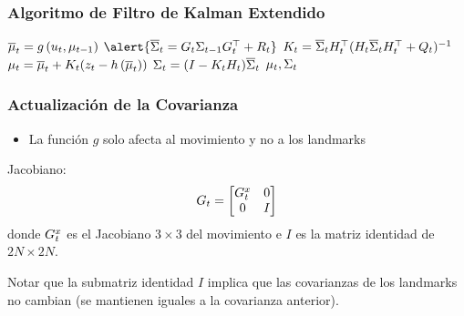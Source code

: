\begin{frame}
    \frametitle{Algoritmo de Filtro de Kalman Extendido}
    
    \begin{algorithmic}[1]
        \State $\overline{\mu}_{t} = g\left( u_{t}, \mu_{t-1} \right)$
        \State $\alert{\overline{\covariance}_{t} = \motionModelJacobian_{t} \covariance_{t-1} \motionModelJacobian_{t}^{\top}+\motionParametersCovariance_{t}}$
        \Statex
        \State $K_{t} = \overline{\Sigma}_{t} H_{t}^{\top} (H_{t} \overline{\Sigma}_{t}  H_{t}^{\top} + Q_{t})^{-1} $
        \State $\mu_{t} = \overline{\mu}_{t} + K_{t} (z_{t} - h\left( \overline{\mu}_{t} \right))$
        \State $\Sigma_{t} =  (I - K_{t} H_{t}) \overline{\Sigma}_{t}$
        \State \Return $\mu_{t}, \Sigma_{t}$
    \EndProcedure
    \end{algorithmic}
\end{frame}

\begin{frame}
    \frametitle{Actualización de la Covarianza}

    \begin{itemize}
        \item La función $g$ solo afecta al movimiento y no a los landmarks
    \end{itemize}

    Jacobiano:
    \begin{equation*}
        G_t = 
        \begin{bmatrix}
            G_{t}^{x} & 0 \\
            0 & I
        \end{bmatrix}
    \end{equation*}
    donde $G_{t}^{x}$ es el Jacobiano $3 \times 3$ del movimiento e $I$ es la matriz identidad de $2N \times 2N$.


    Notar que la submatriz identidad $I$ implica que las covarianzas de los landmarks no cambian (se mantienen iguales a la covarianza anterior).

\end{frame}

